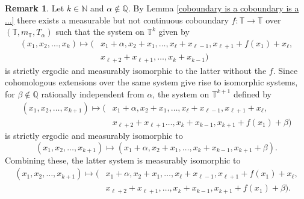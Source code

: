 \documentclass[12pt]{amsart}
\theoremstyle{definition}
\theoremstyle{plain}
\theoremstyle{definition}
\newtheorem{remark}[theorem]{Remark}
\numberwithin{equation}{section}
\begin{document}
\begin{remark}\label{two coboundaries does not change much}
    Let $k\in \mathbb{N}$ and $\alpha\notin \mathbb{Q}$. By Lemma \ref{coboundary is a coboundary is a ...} there exists a measurable but not continuous coboundary $f\colon \mathbb{T} \rightarrow \mathbb{T}$ over $(\mathbb{T},m_{\mathbb{T}},T_\alpha)$ such that the system on $\mathbb{T}^{k}$ given by 
    \begin{align*}
    (x_1,x_2,\dots,x_k)\longmapsto (&x_1+\alpha,x_2+x_1,\dots,x_{\ell}+x_{\ell-1},x_{\ell+1}+f(x_1)+x_{\ell},\\ &x_{\ell+2}+x_{\ell+1},\dots,x_{k}+x_{k-1})
    \end{align*}
    is strictly ergodic and measurably isomorphic to the latter without the $f$. Since cohomologous extensions over the same system give rise to isomorphic systems, for $\beta \notin \mathbb{Q}$ rationally independent from $\alpha$, the system on $\mathbb{T}^{k+1}$ defined by
    \begin{align*}
    (x_1,x_2,\dots,x_{k+1}) \longmapsto (&x_1+\alpha,x_2+x_1,\dots,x_{\ell}+x_{\ell-1},x_{\ell+1}+x_{\ell},\\ &x_{\ell+2}+x_{\ell+1}\dots,x_{k}+x_{k-1},x_{k+1}+f(x_1)+\beta)
    \end{align*}
    is strictly ergodic and measurably isomorphic to $$(x_1,x_2,\dots,x_{k+1}) \longmapsto (x_1+\alpha,x_2+x_1,\dots,x_{k}+x_{k-1},x_{k+1}+\beta).$$ Combining these, the latter system is measurably isomorphic to \begin{align*}
      (x_1,x_2,\dots,x_{k+1})\longmapsto\Big(&x_1+\alpha,x_2+x_1,\dots,x_{\ell}+x_{\ell-1},x_{\ell+1}+f(x_1)+x_{\ell},\\ &x_{\ell+2}+x_{\ell+1},\dots,x_{k}+x_{k-1},x_{k+1}+f(x_1)+\beta\Big).
  \end{align*}
\end{remark}
\end{document}
